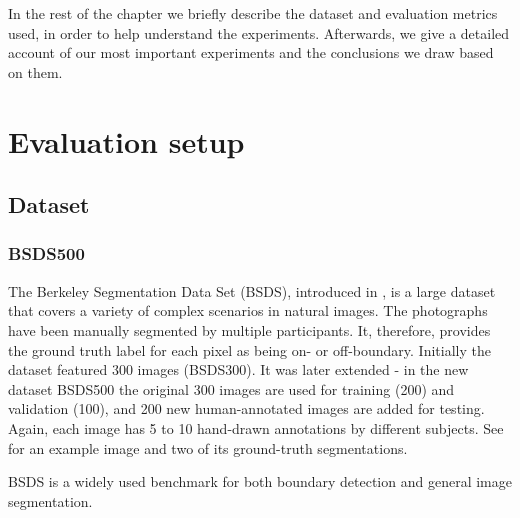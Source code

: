 In the rest of the chapter we briefly describe the dataset and evaluation metrics used, in order to help understand the experiments. Afterwards, we give a detailed account of our most important experiments and the conclusions we draw based on them.

\section{Evaluation setup} %
\subsection{Dataset}
\label{sec:ch5-BSDS500-dataset}
\subsubsection{BSDS500}
The Berkeley Segmentation Data Set (BSDS), introduced in \cite{Martin01}, is a large dataset that covers a variety of complex scenarios in natural images. The photographs have been manually segmented by multiple participants. It, therefore, provides the ground truth label for each pixel as being on- or off-boundary. Initially the dataset featured 300 images (BSDS300). It was later extended - in the new dataset BSDS500 \cite{Arbelaez11} the original 300 images are used for training (200) and validation (100), and 200 new human-annotated images are added for testing. Again, each image has 5 to 10 hand-drawn annotations by different subjects. See  for an example image and two of its ground-truth segmentations. %

BSDS is a widely used benchmark for both boundary detection and general image segmentation.

